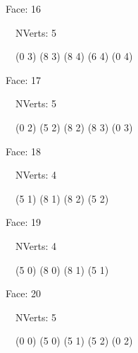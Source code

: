 \documentclass{article}
\begin{document}
{\footnotesize 

Face: 16

\   \    NVerts: 5

 \   \   (0 3) (8 3) (8 4) (6 4) (0 4)}

{\footnotesize 

Face: 17

\   \    NVerts: 5

 \   \   (0 2) (5 2) (8 2) (8 3) (0 3)}

{\footnotesize 

Face: 18

\   \    NVerts: 4

 \   \   (5 1) (8 1) (8 2) (5 2)}

{\footnotesize 

Face: 19

\   \    NVerts: 4

 \   \   (5 0) (8 0) (8 1) (5 1)}

{\footnotesize 

Face: 20

\   \    NVerts: 5

 \   \   (0 0) (5 0) (5 1) (5 2) (0 2)}


 \newpage
\end{document}
